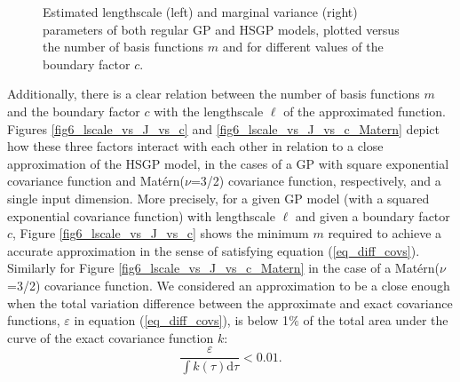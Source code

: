 \documentclass[onecolumn,a4paper,11pt]{article}
\begin{document}
\begin{figure}
\caption{Estimated lengthscale (left) and marginal variance (right) parameters of both regular GP and HSGP models, plotted versus the number of basis functions $m$ and for different values of the boundary factor $c$.}
  \label{fig5_lscale_vs_J}
\end{figure}


Additionally, there is a clear relation between the number of basis functions $m$ and the boundary factor $c$ with the lengthscale $\ell$ of the approximated function. Figures \ref{fig6_lscale_vs_J_vs_c} and \ref{fig6_lscale_vs_J_vs_c_Matern} depict how these three factors interact with each other in relation to a close approximation of the HSGP model, in the cases of a GP with square exponential covariance function and Mat\'ern($\nu$=3/2) covariance function, respectively, and a single input dimension. More precisely, for a given GP model (with a squared exponential covariance function) with lengthscale $\ell$ and given a boundary factor $c$, Figure \ref{fig6_lscale_vs_J_vs_c} shows the minimum $m$ required to achieve a accurate approximation in the sense of satisfying equation (\ref{eq_diff_covs}). Similarly for Figure \ref{fig6_lscale_vs_J_vs_c_Matern} in the case of a Mat\'ern($\nu$=3/2) covariance function. We considered an approximation to be a close enough when the total variation difference between the approximate and exact covariance functions, $\varepsilon$ in equation (\ref{eq_diff_covs}), is below 1$\%$ of the total area under the curve of the exact covariance function $k$:
%
\begin{equation*}
 \frac{\varepsilon}{\int k(\tau) \mathrm{d}\tau} < 0.01.
\end{equation*}
\end{document}
